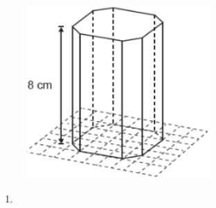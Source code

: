 \documentclass[twocolumn,oneside,a4paper,12.0pt]{article}
\begin{document}
\begin{enumerate}
	\begin{figure}[!htb]
	\center
	\includegraphics[width=7cm]{Extras/v3.png}
	\end{figure}


\begin{enumerate}
\item 
\end{enumerate}

\end{enumerate}
\end{document}

